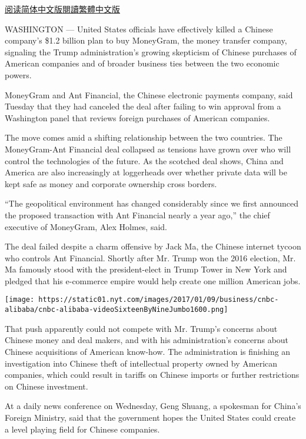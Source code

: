 \href{https://cn.nytimes.com/business/20180104/moneygram-ant-financial-china-cfius/}{阅读简体中文版}\href{https://cn.nytimes.com/business/20180104/moneygram-ant-financial-china-cfius/zh-hant/}{閱讀繁體中文版}

WASHINGTON --- United States officials have effectively killed a Chinese
company's \$1.2 billion plan to buy MoneyGram, the money transfer
company, signaling the Trump administration's growing skepticism of
Chinese purchases of American companies and of broader business ties
between the two economic powers.

MoneyGram and Ant Financial, the Chinese electronic payments company,
said Tuesday that they had canceled the deal after failing to win
approval from a Washington panel that reviews foreign purchases of
American companies.

The move comes amid a shifting relationship between the two countries.
The MoneyGram-Ant Financial deal collapsed as tensions have grown over
who will control the technologies of the future. As the scotched deal
shows, China and America are also increasingly at loggerheads over
whether private data will be kept safe as money and corporate ownership
cross borders.

``The geopolitical environment has changed considerably since we first
announced the proposed transaction with Ant Financial nearly a year
ago,'' the chief executive of MoneyGram, Alex Holmes, said.

The deal failed despite a charm offensive by Jack Ma, the Chinese
internet tycoon who controls Ant Financial. Shortly after Mr. Trump won
the 2016 election, Mr. Ma famously stood with the president-elect in
Trump Tower in New York and pledged that his e-commerce empire would
help create one million American jobs.

\texttt{[image: https://static01.nyt.com/images/2017/01/09/business/cnbc-alibaba/cnbc-alibaba-videoSixteenByNineJumbo1600.png]}

That push apparently could not compete with Mr. Trump's concerns about
Chinese money and deal makers, and with his administration's concerns
about Chinese acquisitions of American know-how. The administration is
finishing an investigation into Chinese theft of intellectual property
owned by American companies, which could result in tariffs on Chinese
imports or further restrictions on Chinese investment.

At a daily news conference on Wednesday, Geng Shuang, a spokesman for
China's Foreign Ministry, said that the government hopes the United
States could create a level playing field for Chinese companies.

